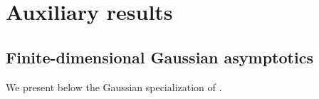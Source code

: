 \documentclass[11pt]{amsart}
\theoremstyle{definition}
\theoremstyle{remark}
\newtheorem{remark}[remark]{Remark}
\begin{document}

\appendix
\section{Auxiliary results}

\subsection{Finite-dimensional Gaussian asymptotics}

We present below the Gaussian specialization of
\cite[Example~6.1, Theorem~5.1]{Hashorva2007}. 
\end{document}

